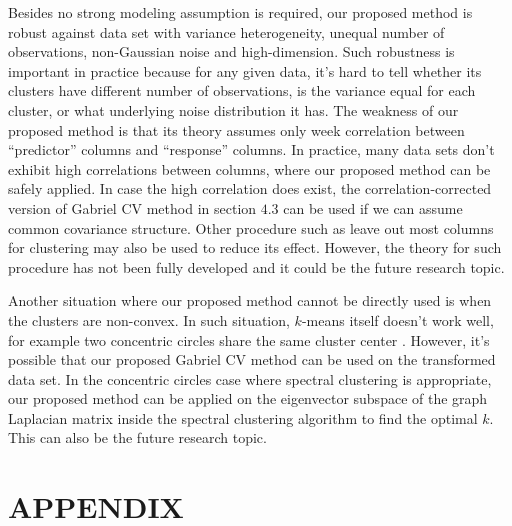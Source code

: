 \documentclass[12pt]{article}
\begin{document}
Besides no strong modeling assumption is required, our proposed method is robust against data set 
with variance heterogeneity, unequal number of observations, non-Gaussian noise and high-dimension. 
Such robustness is important in practice because for any given data, it's hard to tell whether
its clusters have different number of observations, is the variance equal for each cluster,
or what underlying noise distribution it has. The weakness of our proposed method is 
that its theory assumes only week correlation between ``predictor'' columns and ``response'' 
columns. In practice, many data sets don't exhibit high correlations between columns, where
our proposed method can be safely applied. In case the high correlation does exist, 
the correlation-corrected version of Gabriel CV method in section $4.3$ can be used if we can 
assume common covariance structure. Other procedure such as leave out most columns for clustering 
may also be used to reduce its effect. However, the theory for such procedure has not
been fully developed and it could be the future research topic. 

Another situation where our proposed method cannot be directly used is when the clusters 
are non-convex. In such situation, $k$-means itself doesn't work well, for example two 
concentric circles share the same cluster center \citep{hastie2009elements}. However, it's 
possible that our proposed Gabriel CV method can be used on the transformed data set. In the
concentric circles case where spectral clustering is appropriate, our proposed method can be applied 
on the eigenvector subspace of the graph Laplacian matrix inside the spectral clustering algorithm
to find the optimal $k$. This can also be the future research topic. 

\clearpage

\section*{\textbf{APPENDIX}}
\appendix
\end{document}
